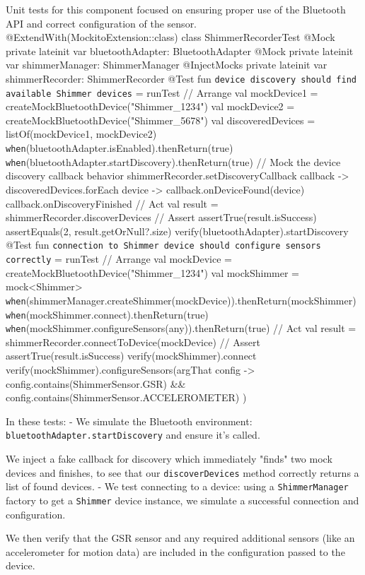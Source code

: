 {{Unit tests for this component focused on ensuring proper use of the Bluetooth
API and correct configuration of the sensor.
@ExtendWith(MockitoExtension::class) class ShimmerRecorderTest { @Mock private
lateinit var bluetoothAdapter: BluetoothAdapter @Mock private lateinit var
shimmerManager: ShimmerManager @InjectMocks private lateinit var
shimmerRecorder: ShimmerRecorder @Test fun \texttt{device discovery should find
available Shimmer devices} = runTest { // Arrange val mockDevice1 =
createMockBluetoothDevice("Shimmer\_1234") val mockDevice2 =
createMockBluetoothDevice("Shimmer\_5678") val discoveredDevices =
listOf(mockDevice1, mockDevice2)
\texttt{when}(bluetoothAdapter.isEnabled).thenReturn(true)
\texttt{when}(bluetoothAdapter.startDiscovery).thenReturn(true) // Mock the
device discovery callback behavior shimmerRecorder.setDiscoveryCallback {
callback -> discoveredDevices.forEach { device -> callback.onDeviceFound(device)
} callback.onDiscoveryFinished } // Act val result =
shimmerRecorder.discoverDevices // Assert assertTrue(result.isSuccess)
assertEquals(2, result.getOrNull?.size) verify(bluetoothAdapter).startDiscovery
} @Test fun \texttt{connection to Shimmer device should configure sensors
correctly} = runTest { // Arrange val mockDevice =
createMockBluetoothDevice("Shimmer\_1234") val mockShimmer = mock<Shimmer>
\texttt{when}(shimmerManager.createShimmer(mockDevice)).thenReturn(mockShimmer)
\texttt{when}(mockShimmer.connect).thenReturn(true)
\texttt{when}(mockShimmer.configureSensors(any)).thenReturn(true) // Act val
result = shimmerRecorder.connectToDevice(mockDevice) // Assert
assertTrue(result.isSuccess) verify(mockShimmer).connect
verify(mockShimmer).configureSensors(argThat { config ->
config.contains(ShimmerSensor.GSR) &&
config.contains(ShimmerSensor.ACCELEROMETER) }) } }

In these tests: - We simulate the Bluetooth environment:
\texttt{bluetoothAdapter.startDiscovery} and ensure it's called.

We inject a fake callback for discovery which immediately "finds" two mock
devices and finishes, to see that our \texttt{discoverDevices} method correctly
returns a list of found devices. - We test connecting to a device: using a
\texttt{ShimmerManager} factory to get a \texttt{Shimmer} device instance, we
simulate a successful connection and configuration.

We then verify that the GSR sensor and any required additional sensors (like an
accelerometer for motion data) are included in the configuration passed to the
device.

}}
